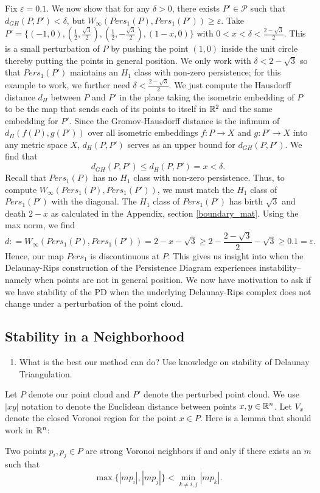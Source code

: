 \documentclass[letterpaper,titlepage]{article}
\begin{document}
Fix $\varepsilon=0.1$. We now show that for any $\delta > 0$, there exists $P' \in \mathcal{P}$ such that $d_{GH}(P,P')< \delta$, but $W_\infty(Pers_1(P), Pers_1(P')) \geq \varepsilon.$ Take $P' = \{(-1,0),(\frac{1}{2},\frac{\sqrt{3}}{2}),(\frac{1}{2},-\frac{\sqrt{3}}{2}),(1-x,0)\}$ with $0<x < \delta < \frac{2-\sqrt{3}}{2}$. This is a small perturbation of $P$ by pushing the point $(1,0)$ inside the unit circle thereby putting the points in general position. We only work with $\delta<2-\sqrt{3}$ so that $Pers_1(P')$ maintains an $H_1$ class with non-zero persistence; for this example to work, we further need $\delta < \frac{2-\sqrt{3}}{2}$. We just compute the Hausdorff distance $d_H$ between $P$ and $P'$ in the plane taking the isometric embedding of $P$ to be the map that sends each of its points to itself in $\mathbb{R}^2$ and the same embedding for $P'$. Since the Gromov-Hausdorff distance is the infimum of $d_H(f(P),g(P'))$ over all isometric embeddings $f:P \to X$ and $g: P' \to X$ into any metric space $X$, $d_H(P,P')$ serves as an upper bound for $d_{GH}(P,P').$ We find that
$$d_{GH}(P,P')\leq d_H(P,P')=x<\delta.$$
Recall that $Pers_1(P)$ has no $H_1$ class with non-zero persistence. Thus, to compute $W_\infty(Pers_1(P),Pers_1(P'))$, we must match the $H_1$ class of $Pers_1(P')$ with the diagonal. The $H_1$ class of $Pers_1(P')$ has birth $\sqrt{3}$ and death $2-x$ as calculated in the Appendix, section \ref{boundary_mat}. Using the max norm, we find
$$d: = W_\infty(Pers_1(P),Pers_1(P')) = 2-x-\sqrt{3} \geq 2-\frac{2-\sqrt{3}}{2} -\sqrt{3} \geq 0.1 = \varepsilon.$$
Hence, our map $Pers_1$ is discontinuous at $P$. This gives us insight into when the Delaunay-Rips construction of the Persistence Diagram experiences instability--namely when points are not in general position. We now have motivation to ask if we have stability of the PD when the underlying Delaunay-Rips complex does not change under a perturbation of the point cloud.


\subsection{Stability in a Neighborhood}\label{stability}
\begin{enumerate}
    \item What is the best our method can do? Use knowledge on stability of Delaunay Triangulation.
\end{enumerate}
    Let $P$ denote our point cloud and $P'$ denote the perturbed point cloud. We use $|xy|$ notation to denote the Euclidean distance between points $x,y \in \mathbb{R}^n$. Let $V_x$ denote the closed Voronoi region for the point $x \in P$. Here is a lemma that should work in $\mathbb{R}^n$:
    \begin{lem}\label{paperlemma}
    Two points $p_i,p_j \in P$ are strong Voronoi neighbors if and only if there exists an $m$ such that
    $$\max\{|mp_i|,|mp_j|\} < \min_{k \neq i,j}|mp_k|.$$
    \end{lem}
    
\end{document}
